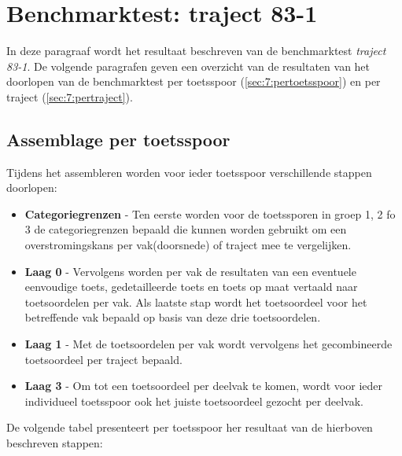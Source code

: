 \section{Benchmarktest: traject 83-1}
	\label{ch:benchmarktTest7}
In deze paragraaf wordt het resultaat beschreven van de benchmarktest \textit{traject 83-1}. De volgende paragrafen geven een overzicht van de resultaten van het doorlopen van de benchmarktest per toetsspoor (\autoref{sec:7:pertoetsspoor}) en per traject (\autoref{sec:7:pertraject}).

\subsection{Assemblage per toetsspoor}
	\label{sec:7:pertoetsspoor}
Tijdens het assembleren worden voor ieder toetsspoor verschillende stappen doorlopen:
\begin{itemize}
	\item \textbf{Categoriegrenzen} - Ten eerste worden voor de toetssporen in groep 1, 2 fo 3 de categoriegrenzen bepaald die kunnen worden gebruikt om een overstromingskans per vak(doorsnede) of traject mee te vergelijken.
	\item \textbf{Laag 0} - Vervolgens worden per vak de resultaten van een eventuele eenvoudige toets, gedetailleerde toets en toets op maat vertaald naar toetsoordelen per vak. Als laatste stap wordt het toetsoordeel voor het betreffende vak bepaald op basis van deze drie toetsoordelen.
	\item \textbf{Laag 1} - Met de toetsoordelen per vak wordt vervolgens het gecombineerde toetsoordeel per traject bepaald.
	\item \textbf{Laag 3} - Om tot een toetsoordeel per deelvak te komen, wordt voor ieder individueel toetsspoor ook het juiste toetsoordeel gezocht per deelvak.
\end{itemize}

De volgende tabel presenteert per toetsspoor her resultaat van de hierboven beschreven stappen:

